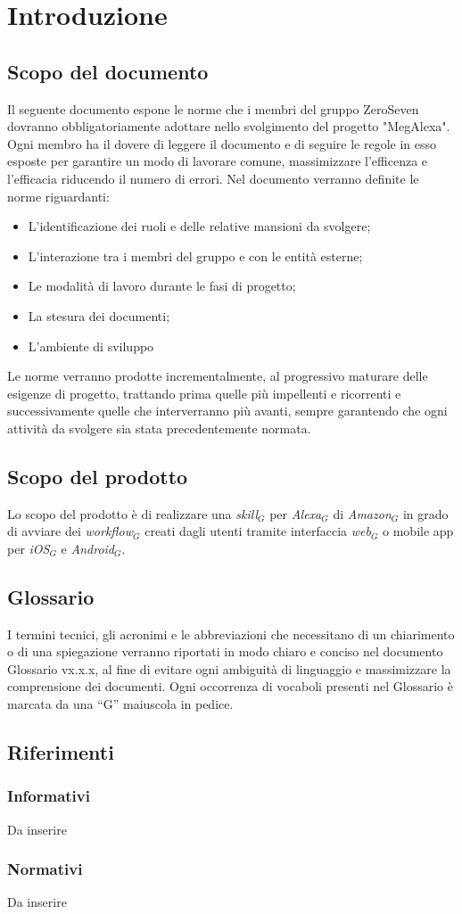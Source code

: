 \newpage
\section{Introduzione}
\subsection{Scopo del documento}
Il seguente documento espone le norme che i membri del gruppo ZeroSeven dovranno obbligatoriamente adottare nello svolgimento del progetto "MegAlexa".
Ogni membro ha il dovere di leggere il documento e di seguire le regole in esso esposte per garantire  un modo di lavorare comune, massimizzare l'efficenza e l'efficacia riducendo il numero di errori.
Nel documento verranno definite le  norme riguardanti:
\begin{itemize}
		\item L'identificazione dei ruoli e delle relative mansioni da svolgere;
		\item L'interazione tra i membri del gruppo e con le entità esterne;
		\item Le modalità di lavoro durante le fasi di progetto;
		\item La stesura dei documenti;
		\item L'ambiente di sviluppo
\end{itemize}
Le norme verranno prodotte incrementalmente, al progressivo maturare delle esigenze di progetto, trattando prima quelle più impellenti e ricorrenti e successivamente quelle che interverranno più avanti, sempre garantendo che ogni attività da svolgere sia stata precedentemente normata.

\subsection{Scopo del prodotto}
Lo scopo del prodotto è di realizzare una \textit{skill$_{G}$} per \textit{Alexa$_{G}$} di \textit{Amazon$_{G}$} in grado di avviare dei \textit{workflow$_{G}$} creati dagli utenti tramite interfaccia \textit{web$_{G}$} o mobile app per \textit{iOS$_{G}$} e \textit{Android$_{G}$}.

\subsection{Glossario}
I termini tecnici, gli acronimi e le abbreviazioni che necessitano di un chiarimento
o di una spiegazione verranno riportati in modo chiaro e conciso nel
documento Glossario vx.x.x, al fine di evitare ogni ambiguità di linguaggio
e massimizzare la comprensione dei documenti. Ogni occorrenza di vocaboli
presenti nel Glossario è marcata da una “G” maiuscola in pedice.
\subsection{Riferimenti}
\subsubsection{Informativi}
Da inserire
\subsubsection{Normativi}
Da inserire